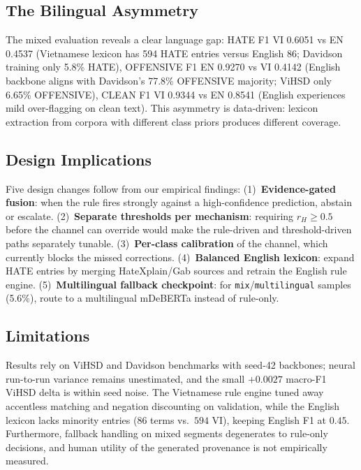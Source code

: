 \subsection{The Bilingual Asymmetry}
\label{sec:asymmetry_bilingual}

The mixed evaluation reveals a clear language gap: HATE F1 VI 0.6051 vs EN
0.4537 (Vietnamese lexicon has 594 HATE entries versus English 86; Davidson
training only 5.8\% HATE), OFFENSIVE F1 EN 0.9270 vs VI 0.4142 (English
backbone aligns with Davidson's 77.8\% OFFENSIVE majority; ViHSD only 6.65\%
OFFENSIVE), CLEAN F1 VI 0.9344 vs EN 0.8541 (English experiences mild
over-flagging on clean text). This asymmetry is data-driven: lexicon extraction
from corpora with different class priors produces different coverage.

\subsection{Design Implications}
\label{sec:implications_bilingual}

Five design changes follow from our empirical findings:
(1)~\textbf{Evidence-gated fusion}: when the rule fires strongly against a high-confidence \clean{} prediction, abstain or escalate.
(2)~\textbf{Separate thresholds per mechanism}: requiring $r_H\ge0.5$ before the \hate{} channel can override would make the rule-driven and threshold-driven paths separately tunable.
(3)~\textbf{Per-class calibration} of the \clean{} channel, which currently blocks the missed corrections.
(4)~\textbf{Balanced English lexicon}: expand HATE entries by merging HateXplain/Gab sources and retrain the English rule engine.
(5)~\textbf{Multilingual fallback checkpoint}: for \texttt{mix}/\texttt{multilingual} samples (5.6\%), route to a multilingual mDeBERTa instead of rule-only.

\subsection{Limitations}
\label{sec:limitations}
Results rely on ViHSD and Davidson benchmarks with seed-42 backbones; neural run-to-run variance remains unestimated, and the small $+0.0027$ macro-F1 ViHSD delta is within seed noise. The Vietnamese rule engine tuned away accentless matching and negation discounting on validation, while the English lexicon lacks minority \hate{} entries ($86$ terms vs.\ $594$ VI), keeping English \hate{} F1 at $0.45$. Furthermore, fallback handling on mixed segments degenerates to rule-only decisions, and human utility of the generated provenance is not empirically measured.

